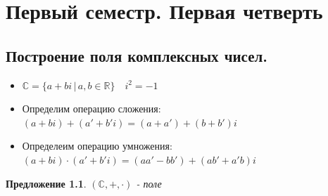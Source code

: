 \documentclass[12pt,letterpaper]{report}
\newtheorem*{theorem-non}{Предложение}
\theoremstyle{definition}
\begin{document}
\chapter{Первый семестр. Первая четверть}

\section{Построение поля комплексных чисел.}
\begin{itemize}
  \item $\mathbb{C} = \{a + bi\,|\, a, b \in \mathbb{R} \} \quad i^2 = -1$ 
  \item Определим операцию сложения: $(a + bi) + (a' + b'i) = (a + a') + (b + b')i$
  \item Определеим операцию умножения: $(a + bi) \cdot (a' + b'i) = (aa' - bb') + (ab' + a'b)i$ 
\end{itemize} 
\begin{theorem-non}
  $(\mathbb{C}, +, \cdot)$ - поле
\end{theorem-non}
\end{document}
